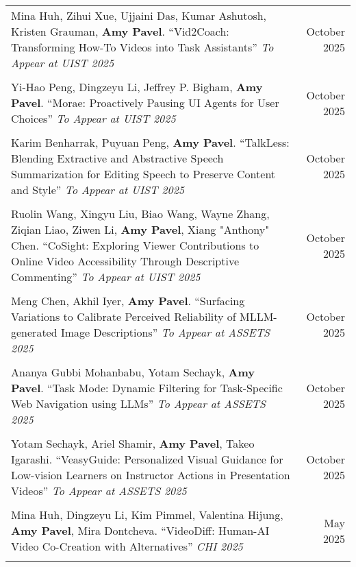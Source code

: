 \begin{longtable}{Xr}
	Mina Huh, Zihui Xue, Ujjaini Das, Kumar Ashutosh, Kristen Grauman, \textbf{Amy Pavel}. ``Vid2Coach: Transforming How-To Videos into Task Assistants'' \textit{To Appear at UIST 2025} & October 2025 \\
	\\

	Yi-Hao Peng, Dingzeyu Li, Jeffrey P. Bigham, \textbf{Amy Pavel}. ``Morae: Proactively Pausing UI Agents for User Choices'' \textit{To Appear at UIST 2025} & October 2025 \\
	\\

	Karim Benharrak, Puyuan Peng, \textbf{Amy Pavel}. ``TalkLess: Blending Extractive and Abstractive Speech Summarization for Editing Speech to Preserve Content and Style'' \textit{To Appear at UIST 2025} & October 2025 \\
	\\

	Ruolin Wang, Xingyu Liu, Biao Wang, Wayne Zhang, Ziqian Liao, Ziwen Li, \textbf{Amy Pavel}, Xiang "Anthony" Chen. ``CoSight: Exploring Viewer Contributions to Online Video Accessibility Through Descriptive Commenting'' \textit{To Appear at UIST 2025} & October 2025 \\
	\\

	Meng Chen, Akhil Iyer, \textbf{Amy Pavel}. ``Surfacing Variations to Calibrate Perceived Reliability of MLLM-generated Image Descriptions'' \textit{To Appear at ASSETS 2025} & October 2025 \\
	\\

	Ananya Gubbi Mohanbabu, Yotam Sechayk, \textbf{Amy Pavel}. ``Task Mode: Dynamic Filtering for Task-Specific Web Navigation using LLMs'' \textit{To Appear at ASSETS 2025} & October 2025 \\
	\\

	Yotam Sechayk, Ariel Shamir, \textbf{Amy Pavel}, Takeo Igarashi. ``VeasyGuide: Personalized Visual Guidance for Low-vision Learners on Instructor Actions in Presentation Videos'' \textit{To Appear at ASSETS 2025} & October 2025 \\
	\\

	Mina Huh, Dingzeyu Li, Kim Pimmel, Valentina Hijung, \textbf{Amy Pavel}, Mira Dontcheva. ``VideoDiff: Human-AI Video Co-Creation with Alternatives'' \textit{CHI 2025} & May 2025 \\
	\\


\end{longtable}

